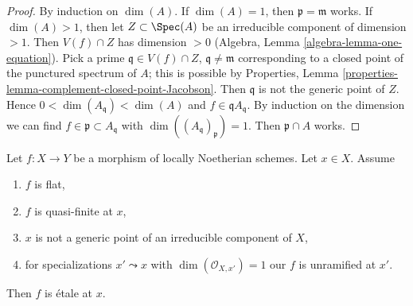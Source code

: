 \begin{proof}
By induction on $\dim(A)$. If $\dim(A) = 1$, then $\mathfrak p = \mathfrak m$
works. If $\dim(A) > 1$, then let $Z \subset \Spec(A)$ be an irreducible
component of dimension $> 1$. Then $V(f) \cap Z$ has dimension $> 0$
(Algebra, Lemma \ref{algebra-lemma-one-equation}). Pick a prime
$\mathfrak q \in V(f) \cap Z$, $\mathfrak q \not = \mathfrak m$
corresponding to a closed point of the punctured spectrum of $A$;
this is possible by
Properties, Lemma \ref{properties-lemma-complement-closed-point-Jacobson}.
Then $\mathfrak q$ is not the generic point of $Z$. Hence
$0 < \dim(A_\mathfrak q) < \dim(A)$ and $f \in \mathfrak q A_\mathfrak q$.
By induction on the dimension we can find
$f \in \mathfrak p \subset A_\mathfrak q$ with
$\dim((A_\mathfrak q)_\mathfrak p) = 1$.
Then $\mathfrak p \cap A$ works.
\end{proof}

\begin{lemma}
\label{lemma-ramification-quasi-finite-flat}
Let $f : X \to Y$ be a morphism of locally Noetherian schemes.
Let $x \in X$. Assume
\begin{enumerate}
\item $f$ is flat,
\item $f$ is quasi-finite at $x$,
\item $x$ is not a generic point of an irreducible component of $X$,
\item for specializations $x' \leadsto x$ with
$\dim(\mathcal{O}_{X, x'}) = 1$ our $f$ is unramified at $x'$.
\end{enumerate}
Then $f$ is \'etale at $x$.
\end{lemma}

